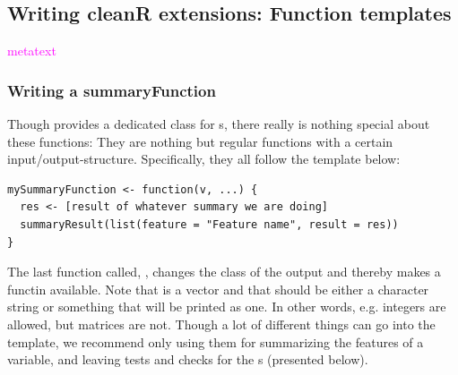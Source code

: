 \documentclass[article]{jss}
\newcommand{\hl}[1]{\textcolor{magenta}{#1}}
\newcommand{\R}[1]{\code{#1}}
\begin{document}
\subsection{Writing cleanR extensions: Function templates}
\hl{metatext}

\subsubsection{Writing a summaryFunction}
Though  provides a dedicated class for s, there really is nothing special about these functions: They are nothing but regular functions with a certain input/output-structure. Specifically, they all follow the template below:
\begin{Verbatim}
mySummaryFunction <- function(v, ...) {
  res <- [result of whatever summary we are doing]
  summaryResult(list(feature = "Feature name", result = res))
}
\end{Verbatim}
The last function called, \R{summaryResult()}, changes the class of the output and thereby makes a \R{print()} functin available.  Note that  is a vector and that  should be either a character string or something that will be printed as one. In other words, e.g. integers are allowed, but matrices are not. Though a lot of different things can go into the  template, we recommend only using them for summarizing the features of a variable, and leaving tests and checks for the s (presented below).
\end{document}
